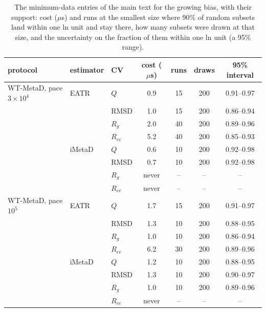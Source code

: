 \begin{table}[H]\centering
\caption{The minimum-data entries of the main text for the growing bias, with their support: cost ($\mu$s) and runs at the smallest size where 90\% of random subsets land within one ln unit and stay there, how many subsets were drawn at that size, and the uncertainty on the fraction of them within one ln unit (a 95\% range).}\label{tab:s15}
\begin{tabular}{lllcccc}\toprule
protocol & estimator & CV & cost ($\mu$s) & runs & draws & 95\% interval\\ \midrule
WT-MetaD, pace $3\times10^4$ & EATR & $Q$ & 0.9 & 15 & 200 & 0.91--0.97 \\
 &  & RMSD & 1.0 & 15 & 200 & 0.86--0.94 \\
 &  & $R_g$ & 2.0 & 40 & 200 & 0.89--0.96 \\
 &  & $R_{ee}$ & 5.2 & 40 & 200 & 0.85--0.93 \\
 & iMetaD & $Q$ & 0.6 & 10 & 200 & 0.92--0.98 \\
 &  & RMSD & 0.7 & 10 & 200 & 0.92--0.98 \\
 &  & $R_g$ & never & -- & -- & -- \\
 &  & $R_{ee}$ & never & -- & -- & -- \\
WT-MetaD, pace $10^5$ & EATR & $Q$ & 1.7 & 15 & 200 & 0.91--0.97 \\
 &  & RMSD & 1.3 & 10 & 200 & 0.88--0.95 \\
 &  & $R_g$ & 1.0 & 10 & 200 & 0.86--0.94 \\
 &  & $R_{ee}$ & 6.2 & 30 & 200 & 0.89--0.96 \\
 & iMetaD & $Q$ & 1.2 & 10 & 200 & 0.88--0.95 \\
 &  & RMSD & 1.3 & 10 & 200 & 0.90--0.97 \\
 &  & $R_g$ & 1.0 & 10 & 200 & 0.89--0.96 \\
 &  & $R_{ee}$ & never & -- & -- & --\\ \bottomrule
\end{tabular}
\end{table}
